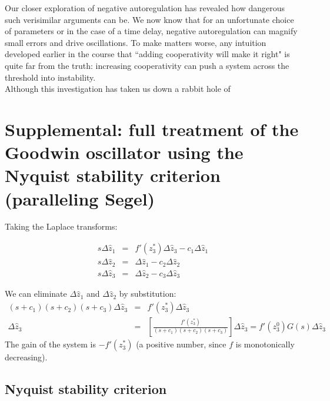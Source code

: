 \documentclass{article}
\begin{document}
Our closer exploration of negative autoregulation has revealed how dangerous such verisimilar arguments can be. We now know that for an unfortunate choice of parameters or in the case of a time delay, negative autoregulation can magnify small errors and drive oscillations. To make matters worse, any intuition developed earlier in the course that ``adding cooperativity will make it right" is quite far from the truth: increasing cooperativity can push a system across the threshold into instability.\\

Although this investigation has taken us down a rabbit hole of 

\section*{Supplemental: full treatment of the Goodwin oscillator using the Nyquist stability criterion (paralleling Segel)}

Taking the Laplace transforms:

\begin{eqnarray*}
s \Delta \hat{z}_1 & = & f'(z_3^*) \Delta \hat{z}_3 - c_1 \Delta \hat{z}_1\\ 
s \Delta \hat{z}_2 & = & \Delta \hat{z}_1 - c_2 \Delta \hat{z}_2\\
s \Delta \hat{z}_3 & = & \Delta \hat{z}_2 - c_3 \Delta \hat{z}_3
\end{eqnarray*}

We can eliminate $\Delta \hat{z}_1 $ and $\Delta \hat{z}_2$ by substitution:
\begin{eqnarray*}
(s + c_1)(s + c_2)(s + c_3) \Delta \hat{z}_3 & = & f'(z_3^*) \Delta \hat{z}_3\\
\Delta \hat{z}_3 & = & \left[ \frac{f'(z_3^*)}{(s + c_1)(s + c_2)(s + c_3)} \right] \Delta \hat{z}_3 = f'(z_3^0) G(s) \Delta \hat{z}_3
\end{eqnarray*}
The gain of the system is $-f'(z_3^*)$ (a positive number, since $f$ is monotonically decreasing).

\subsection*{Nyquist stability criterion}
\end{document}
